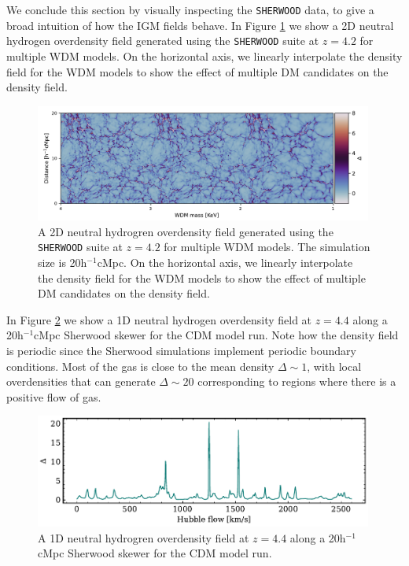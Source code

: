 We conclude this section by visually inspecting the \texttt{SHERWOOD} data, to give a broad intuition of how the IGM fields behave. In Figure \ref{fig: 2D density image} we show a 2D neutral hydrogen overdensity field generated using the \texttt{SHERWOOD} suite at $z=4.2$ for multiple WDM models. On the horizontal axis, we linearly interpolate the density field for the WDM models to show the effect of multiple DM candidates on the density field.
\begin{figure}[ht]
        \centering
        \includegraphics[width=0.99\textwidth]{img/ML/density_image_wdm.pdf}
        \caption{A 2D neutral hydrogren overdensity field generated using the \texttt{SHERWOOD} suite at $z=4.2$ for multiple WDM models. The simulation size is 20h$^{-1}$cMpc. On the horizontal axis, we linearly interpolate the density field for the WDM models to show the effect of multiple DM candidates on the density field.}
        \label{fig: 2D density image}     
\end{figure}
In Figure \ref{fig: 1D density skewer} we show a  1D neutral hydrogen overdensity field at $z=4.4$ along a 20h$^{-1}$cMpc Sherwood skewer for the CDM model run. Note how the density field is periodic since the Sherwood simulations implement periodic boundary conditions. Most of the gas is close to the mean density $\Delta \sim 1$, with local overdensities that can generate $\Delta \sim 20$ corresponding to regions where there is a positive flow of gas.
\begin{figure}
        \centering
        \includegraphics[width=0.99\textwidth]{img/ML/Skewer_density.pdf}
        \caption{A 1D neutral hydrogren overdensity field at $z=4.4$ along a 20h$^{-1}$cMpc Sherwood skewer for the CDM model run.}
        \label{fig: 1D density skewer}     
\end{figure}










